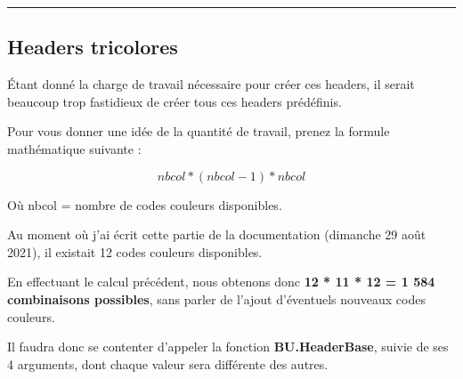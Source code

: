 \documentclass[a4paper,10pt]{article}
\begin{document}

\color{sec2}\par\noindent\rule{\textwidth}{0.4pt}\color{text}

\color{sec2}
\subsection{Headers tricolores}\color{text}

\begin{justify}
    Étant donné la charge de travail nécessaire pour créer ces headers, il serait beaucoup trop fastidieux de créer tous ces headers prédéfinis.
\end{justify}

\begin{justify}
    Pour vous donner une idée de la quantité de travail, prenez la formule mathématique suivante :
\end{justify}

\[nbcol * (nbcol - 1) * nbcol\]

\begin{justify}
    Où nbcol = nombre de codes couleurs disponibles.
\end{justify}

\begin{justify}
    Au moment où j'ai écrit cette partie de la documentation (dimanche 29 août 2021), il existait 12 codes couleurs disponibles.
\end{justify}

\begin{justify}
    En effectuant le calcul précédent, nous obtenons donc \textbf{12 * 11 * 12 = 1 584 combinaisons possibles}, sans parler de l'ajout d'éventuels nouveaux codes couleurs.
\end{justify}

\begin{justify}
    Il faudra donc se contenter d'appeler la fonction \textbf{\color{func}BU.HeaderBase}, suivie de ses 4 arguments, dont chaque valeur sera différente des autres.
\end{justify}
\end{document}
